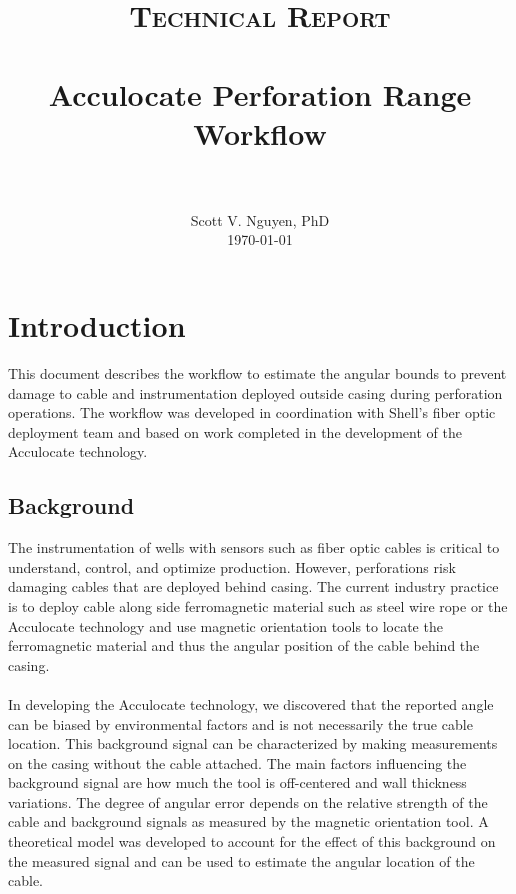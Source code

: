 \documentclass[paper=a4, fontsize=11pt]{scrartcl}
\title{
		\usefont{OT1}{bch}{b}{n}
		\normalfont \normalsize \textsc{Technical Report} \\ [25pt]
		\horrule{0.5pt} \\[0.4cm]
		\huge Acculocate Perforation Range Workflow \\
		\horrule{2pt} \\[0.5cm]
}
\author{
		\normalfont 								\normalsize
        Scott V. Nguyen, PhD\\[-3pt]		\normalsize
        \today
}
\date{}
\numberwithin{equation}{section}		%
\numberwithin{figure}{section}			%
\numberwithin{table}{section}				%
\begin{document}
\maketitle
\section{Introduction}
This document describes the workflow to estimate the angular bounds to prevent damage to cable and instrumentation deployed outside casing during perforation operations.  The workflow was developed in coordination with Shell's fiber optic deployment team and based on work completed in the development of the Acculocate technology.  

\subsection{Background}
The instrumentation of wells with sensors such as fiber optic cables is critical to understand, control, and optimize production.  However, perforations risk damaging cables that are deployed behind casing.  The current industry practice is to deploy cable along side ferromagnetic material such as steel wire rope or the Acculocate technology and use magnetic orientation tools to locate the ferromagnetic material and thus the angular position of the cable behind the casing.  

\paragraph{}
In developing the Acculocate technology, we discovered that the reported angle can be biased by environmental factors and is not necessarily the true cable location.  This background signal can be characterized by making measurements on the casing without the cable attached.  The main factors influencing the background signal are how much the tool is off-centered and wall thickness variations.  The degree of angular error depends on the relative strength of the cable and background signals as measured by the magnetic orientation tool.  A theoretical model was developed to account for the effect of this background on the measured signal and can be used to estimate the angular location of the cable.  
\end{document}
